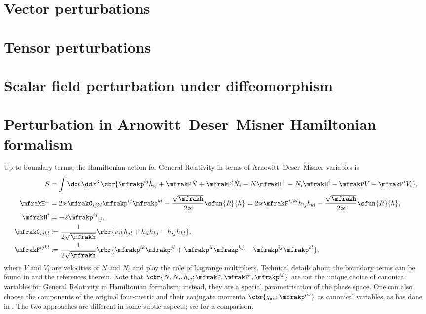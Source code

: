 \documentclass[a4paper,11pt]{article}
\begin{document}
\section{Vector perturbations}



\section{Tensor perturbations}



\section{Scalar field perturbation under diffeomorphism}


\section{Perturbation in Arnowitt--Deser--Misner Hamiltonian formalism}


Up to boundary terms, the Hamiltonian action for General Relativity in terms 
of Arnowitt--Deser--Misner variables is \cite[ch.4.2.2]{Kiefer2012}
\begin{align}
S &=
\int\dd t\,\dd x^3\,\cbr{
\mfrakp^{ij}\dot{h}_{ij} + \mfrakP\dot{N} + \mfrakP^i \dot{N}_i
-N\mfrakH^\perp - N_i\mfrakH^i - \mfrakP V - \mfrakP^i V_i}, \\
\mfrakH^\perp &=
2 \varkappa \mfrakG_{ijkl} \mfrakp^{ij}\mfrakp^{kl}
- \frac{\sqrt{\mfrakh}}{2\varkappa} \sfun{R}{h}
=
2 \varkappa \mfrakF^{ijkl} h_{ij}h_{kl}
- \frac{\sqrt{\mfrakh}}{2\varkappa} \sfun{R}{h},
\\
\mfrakH^i &=
-2 \mfrakp^{ij}{}_{|j},
\\
\mfrakG_{ijkl} &\coloneqq \frac{1}{2\sqrt{\mfrakh}}
\rbr{h_{ik}h_{jl}+h_{il}h_{kj}-h_{ij}h_{kl}},
\\
\mfrakF^{ijkl} &\coloneqq \frac{1}{2\sqrt{\mfrakh}}
\rbr{\mfrakp^{ik}\mfrakp^{jl}+\mfrakp^{il}\mfrakp^{kj}
-\mfrakp^{ij}\mfrakp^{kl}},
\end{align}
where $V$ and $V_i$ are velocities of $N$ and $N_i$ and play the role of 
Lagrange multipliers. Technical details about the boundary terms can be 
found in \cite[ch.\ 4.2]{Poisson2004} and the references therein. Note that 
$\cbr{N, N_i, h_{ij}; \mfrakP, \mfrakP^i, \mfrakp^{ij}}$ are not the unique 
choice of canonical variables for General Relativity in Hamiltonian formalism; 
instead, they are a special parametrisation of the phase space. One can also 
choose the components of the original four-metric and their conjugate momenta 
$\cbr{g_{\mu\nu}; \mfrakp^{\mu\nu}}$ as canonical variables, as 
\citeauthor{Dirac1958} has done in \cite{Dirac1958}. The two approaches are 
different in some subtle aspects; see 
\cite{Kiriushcheva2008} for a comparison.
\end{document}
